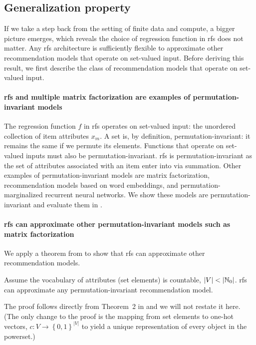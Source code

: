 \subsection{Generalization property}
\label{subsec:method:generalization}
If we take a step back from the setting of finite data and compute, a bigger
picture emerges, which reveals the choice of regression function in \gls{rfs}
does not matter. Any \gls{rfs} architecture is sufficiently flexible to
approximate other recommendation models that operate on set-valued input. Before
deriving this result, we first describe the class of recommendation models that
operate on set-valued input.

\paragraph{\gls{rfs} and multiple matrix factorization are examples of
  permutation-invariant models} The regression function $f$ in \gls{rfs}
operates on set-valued input: the unordered collection of item attributes $x_m$.
A set is, by definition, permutation-invariant: it remains the same if we
permute its elements. Functions that operate on set-valued inputs must also be
permutation-invariant. \gls{rfs} is permutation-invariant as the set of
attributes associated with an item enter into
 via summation. Other
examples of permutation-invariant models are matrix factorization,
recommendation models based on word embeddings, and permutation-marginalized
recurrent neural networks. We show these models are permutation-invariant and
evaluate them in .

\paragraph{\gls{rfs} can approximate other permutation-invariant
  models such as matrix factorization} We apply a theorem from
\citet{zaheer2017deep} to show that \gls{rfs} can approximate
other recommendation models. 

\begin{proposition}
  Assume the vocabulary of attributes (set elements) is countable,
  $\lvert V \rvert < \lvert \mathbb{N}_0 \rvert$. \acrshort{rfs} can approximate any
  permutation-invariant recommendation model.
  \label{prop:universal-approximation}
\end{proposition}
The proof follows directly from Theorem~2 in \citet{zaheer2017deep} and we will
not restate it here. (The only change to the proof is the mapping from set
elements to one-hot vectors,
$c \colon V \to \left\{0, 1\right\}^{\lvert V \rvert}$ to yield a unique
representation of every object in the powerset.)


